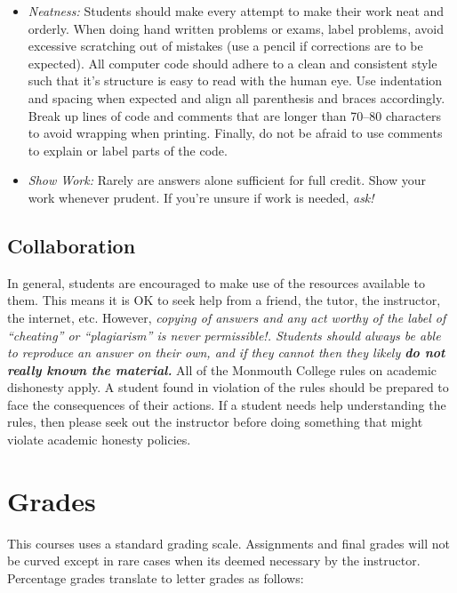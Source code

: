 \documentclass[10pt]{article}
\begin{document}
\begin{itemize}
\begin{itemize}
\item \textit{Neatness:}  Students should make every attempt to make their work neat and orderly. When doing hand written problems or exams, label problems, avoid excessive scratching out of mistakes (use a pencil if corrections are to be expected). All computer code should adhere to a clean and consistent style such that it's structure is easy to read with the human eye. Use indentation and spacing when expected and align all parenthesis and braces accordingly. Break up lines of code and comments that are longer than 70--80 characters to avoid wrapping when printing. Finally, do not be afraid to use comments to explain or label parts of the code.

\item \textit{Show Work:} Rarely are answers alone sufficient for full credit.  Show your work whenever prudent.  If you're unsure if work is needed, \textit{ask!}
\end{itemize}

\end{itemize}


\subsection{Collaboration}

In general, students are encouraged to make use of the resources available to them.  This means it is OK to seek help from a friend, the tutor, the instructor, the internet, etc.  However, \textit{copying of answers and any act worthy of the label of ``cheating'' or ``plagiarism'' is never permissible!. Students should always be able to reproduce an answer on their own, and if they cannot then they likely \textbf{do not really known the material.}} All of the Monmouth College rules on academic dishonesty apply.  A student found in violation of the rules should be prepared to face the consequences of their actions. If a student needs help understanding the rules, then please seek out the instructor before doing something that might violate academic honesty policies.

\section{Grades}

This courses uses a standard grading scale.  Assignments and final grades will not be curved except in rare cases when its deemed necessary by the instructor.  Percentage grades translate to letter grades as follows:
\end{document}
